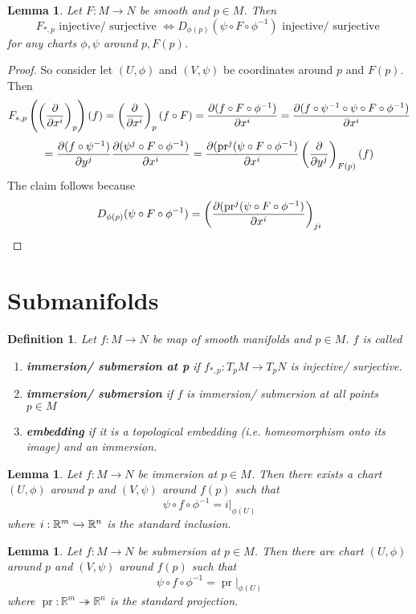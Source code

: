 \documentclass{article}
\numberwithin{theorem}{section}
\newtheorem{lemma}[theorem]{Lemma}
\newtheorem{definition}[theorem]{Definition}
\newcommand{\R}{\mathbb{R}}
\newcommand{\1}{\mathds{1}}
\DeclareMathOperator{\pr}{pr}
\begin{document}
\begin{lemma}
    Let $F: M \to N$ be smooth and $p \in M$. Then 
    \[ F_{*,p} \text{ injective/ surjective } \Leftrightarrow D_{\phi(p)}(\psi \circ F \circ \phi^{-1})  \text{ injective/ surjective }\] 
    for any charts $\phi, \psi$ around $p, F(p)$. 
\end{lemma}
\begin{proof}
    So consider let $(U, \phi)$ and $(V, \psi)$ be coordinates around $p$ and $F(p)$. Then 
    \[ F_{*,p}\left(\left( \pdv{}{x^i} \right)_p \right)(f) = \left( \pdv{}{x^i} \right)_p(f \circ F) =  \pdv{ (f \circ F \circ \phi^{-1})}{x^i}  =  \pdv{ (f \circ \psi^{-1} \circ \psi \circ F \circ \phi^{-1})}{x^i}  \]
    \[ =  \pdv{ (f \circ \psi^{-1})}{y^j}\pdv{(\psi^j \circ F \circ \phi^{-1})}{x^i } = \pdv{(\pr^j(\psi \circ F \circ \phi^{-1})}{x^i} \left( \pdv{}{y^j}\right)_{F(p)} (f) \]
    The claim follows because 
    \[ D_{\phi(p)}(\psi \circ F \circ \phi^{-1}) = \left( \pdv{(\pr^j(\psi \circ F \circ \phi^{-1})}{x^i} \right)_{ji}\]
\end{proof}

\section{Submanifolds}
\begin{definition}
    Let $f: M \to N $ be map of smooth manifolds and $p \in M$. $f$ is called 
    \begin{enumerate}
        \item \textbf{immersion/ submersion at p} if $f_{*,p} : T_pM \to T_pN $ is injective/ surjective.
        \item \textbf{immersion/ submersion} if $f$ is immersion/ submersion at all points $p \in M$
        \item \textbf{embedding} if it is a topological embedding (i.e. homeomorphism onto its image) and an immersion.  
    \end{enumerate}
\end{definition}

\begin{lemma}
    Let $f: M \to N$ be immersion at $p \in M$. Then there exists a chart $(U, \phi)$ around $p$ and $(V, \psi)$ around $f(p)$ such that 
    \[ \psi \circ f \circ \phi^{-1} = i|_{\phi(U)}\]
    where $i : \R^m \xhookrightarrow{} \R^n $ is the standard inclusion. 
\end{lemma}

\begin{lemma}
    Let $f: M \to N$ be submersion at $p \in M$. Then there are chart $(U, \phi)$ around $p$ and $(V, \psi)$ around $f(p)$ such that 
    \[ \psi \circ f \circ \phi^{-1} = \pr|_{\phi(U)}\]
    where $\pr: \R^m \twoheadrightarrow \R^n$ is the standard projection. 
\end{lemma}
\end{document}
